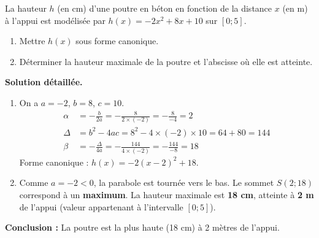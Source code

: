 \documentclass[11pt]{article}
\begin{document}
\begin{exoresolu}
    La hauteur $h$ (en cm) d'une poutre en béton en fonction de la distance $x$ (en m) à l'appui est modélisée par $h(x) = -2x^2 + 8x + 10$ sur $[0;5]$.
    \begin{enumerate}
        \item Mettre $h(x)$ sous forme canonique.
        \item Déterminer la hauteur maximale de la poutre et l'abscisse où elle est atteinte.
    \end{enumerate}
    \tcblower
    \textbf{Solution détaillée.}
    \begin{enumerate}
        \item On a $a=-2$, $b=8$, $c=10$.
        \begin{align*}
            \alpha &= -\frac{b}{2a} = -\frac{8}{2\times(-2)} = -\frac{8}{-4} = 2 \\[4pt]
            \Delta &= b^2 - 4ac = 8^2 - 4\times(-2)\times10 = 64 + 80 = 144 \\[4pt]
            \beta &= -\frac{\Delta}{4a} = -\frac{144}{4\times(-2)} = -\frac{144}{-8} = 18
        \end{align*}
        Forme canonique : $h(x) = -2(x-2)^2 + 18$.
        \item Comme $a = -2 < 0$, la parabole est tournée vers le bas. Le sommet $S(2;18)$ correspond à un \textbf{maximum}.
        La hauteur maximale est \textbf{18 cm}, atteinte à \textbf{2 m} de l'appui (valeur appartenant à l'intervalle $[0;5]$).
    \end{enumerate}
    \textbf{Conclusion :} La poutre est la plus haute (18 cm) à 2 mètres de l'appui.
\end{exoresolu}
\end{document}
